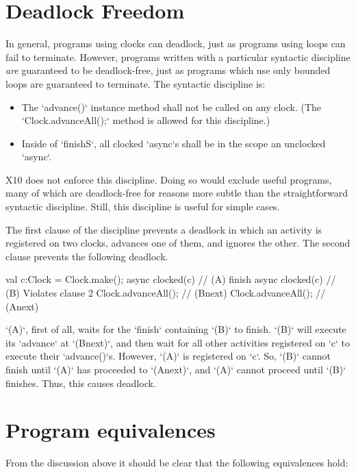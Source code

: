 \section{Deadlock Freedom}

In general, programs using clocks can deadlock, just as programs using loops
can fail to terminate.  However, programs written with a particular syntactic
discipline {\em are} guaranteed to be deadlock-free, just as programs which
use only bounded loops are guaranteed to terminate.  The syntactic discipline
is: 
\begin{itemize}
\item The \xcd`advance()` {instance method} shall not be called on any clock.
      (The 
      \xcd`Clock.advanceAll();` method is allowed for this discipline.)
\item Inside of \xcd`finish{S}`, all clocked \xcd`async`s shall be in the scope
      an unclocked \xcd`async`.  
\end{itemize}
X10 does not enforce this discipline.  Doing so would exclude useful programs,
many of which are deadlock-free for reasons more subtle than the
straightforward syntactic discipline.  Still, this discipline is useful for
simple cases. 

The first clause of the discipline prevents a deadlock in which an activity
is registered on two clocks, advances one of them, and ignores the other. 
The second clause prevents the following deadlock.  
\begin{xten}
val c:Clock = Clock.make();
async clocked(c) {                // (A) 
      finish async clocked(c) {   // (B) Violates clause 2
            Clock.advanceAll();   // (Bnext)
      }
      Clock.advanceAll();         // (Anext)
}
\end{xten}
\xcd`(A)`, first of all, waits for the \xcd`finish` containing \xcd`(B)` to
finish.  
\xcd`(B)` will execute its \xcd`advance` at \xcd`(Bnext)`, and then wait for all
other activities registered on \xcd`c` to execute their \xcd`advance()`s.
However, \xcd`(A)` is registered on \xcd`c`.  So, \xcd`(B)` cannot finish
until \xcd`(A)` has proceeded to \xcd`(Anext)`, and \xcd`(A)` cannot proceed
until \xcd`(B)` finishes. Thus, this causes deadlock.


\section{Program equivalences}
From the discussion above it should be clear that the following
equivalences hold:

